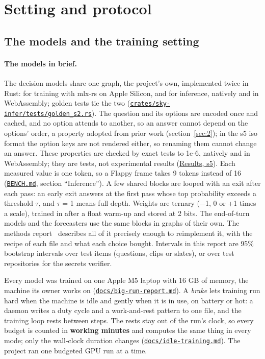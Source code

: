 \documentclass[10pt]{article}
\begin{document}
\section{Setting and protocol}\label{sec:3}

\subsection{The models and the training setting}\label{sec:3.1}

\paragraph{The models in brief.} The decision models share one graph, the project's own, implemented twice in Rust: for training with mlx-rs on Apple Silicon, and for inference, natively and in WebAssembly; golden tests tie the two (\href{https://github.com/maxgfr/skycmd/blob/main/crates/sky-infer/tests/golden_s2.rs}{\texttt{crates/\allowbreak{}sky-infer/\allowbreak{}tests/\allowbreak{}golden\_\allowbreak{}s2.rs}}). The question and its options are encoded once and cached, and no option attends to another, so an answer cannot depend on the options' order, a property adopted from prior work (section~\ref{sec:2}); in the s5 iso format the option keys are not rendered either, so renaming them cannot change an answer. These properties are checked by exact tests to 1e-6, natively and in WebAssembly; they are tests, not experimental results (\href{https://maxgfr.github.io/skycmd/results/\#what-is-guaranteed-by-construction-s5-iso-architecture}{Results, s5}). Each measured value is one token, so a Flappy frame takes 9 tokens instead of 16 (\href{https://github.com/maxgfr/skycmd/blob/main/BENCH.md}{\texttt{BENCH.md}}, section ``Inference''). A few shared blocks are looped with an exit after each pass: an early exit answers at the first pass whose top probability exceeds a threshold $\tau$, and $\tau$ = 1 means full depth. Weights are ternary ($-$1, 0 or +1 times a scale), trained in after a float warm-up and stored at 2 bits. The end-of-turn models and the forecasters use the same blocks in graphs of their own. The methods report~\cite{golfier2026methods} describes all of it precisely enough to reimplement it, with the recipe of each file and what each choice bought. Intervals in this report are 95\% bootstrap intervals over test items (questions, clips or slates), or over test repositories for the secrets verifier.

Every model was trained on one Apple M5 laptop with 16 GB of memory, the machine its owner works on (\href{https://github.com/maxgfr/skycmd/blob/main/docs/big-run-report.md}{\texttt{docs/\allowbreak{}big-run-report.md}}). A \emph{brake} lets training run hard when the machine is idle and gently when it is in use, on battery or hot: a daemon writes a duty cycle and a work-and-rest pattern to one file, and the training loop rests between steps. The rests stay out of the run's clock, so every budget is counted in \textbf{working minutes} and computes the same thing in every mode; only the wall-clock duration changes (\href{https://github.com/maxgfr/skycmd/blob/main/docs/idle-training.md}{\texttt{docs/\allowbreak{}idle-training.md}}). The project ran one budgeted GPU run at a time.
\end{document}
